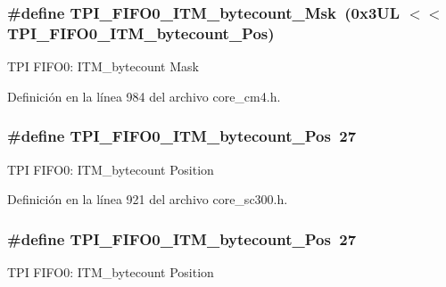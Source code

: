 \subsubsection[{\texorpdfstring{T\+P\+I\+\_\+\+F\+I\+F\+O0\+\_\+\+I\+T\+M\+\_\+bytecount\+\_\+\+Msk}{TPI_FIFO0_ITM_bytecount_Msk}}]{\setlength{\rightskip}{0pt plus 5cm}\#define T\+P\+I\+\_\+\+F\+I\+F\+O0\+\_\+\+I\+T\+M\+\_\+bytecount\+\_\+\+Msk~(0x3\+U\+L $<$$<$ T\+P\+I\+\_\+\+F\+I\+F\+O0\+\_\+\+I\+T\+M\+\_\+bytecount\+\_\+\+Pos)}\hypertarget{group___c_m_s_i_s___t_p_i_ga07bafa971b8daf0d63b3f92b9ae7fa16}{}\label{group___c_m_s_i_s___t_p_i_ga07bafa971b8daf0d63b3f92b9ae7fa16}
T\+PI F\+I\+F\+O0\+: I\+T\+M\+\_\+bytecount Mask 

Definición en la línea 984 del archivo core\+\_\+cm4.\+h.

\subsubsection[{\texorpdfstring{T\+P\+I\+\_\+\+F\+I\+F\+O0\+\_\+\+I\+T\+M\+\_\+bytecount\+\_\+\+Pos}{TPI_FIFO0_ITM_bytecount_Pos}}]{\setlength{\rightskip}{0pt plus 5cm}\#define T\+P\+I\+\_\+\+F\+I\+F\+O0\+\_\+\+I\+T\+M\+\_\+bytecount\+\_\+\+Pos~27}\hypertarget{group___c_m_s_i_s___t_p_i_gac2b6f7f13a2fa0be4aa7645a47dcac52}{}\label{group___c_m_s_i_s___t_p_i_gac2b6f7f13a2fa0be4aa7645a47dcac52}
T\+PI F\+I\+F\+O0\+: I\+T\+M\+\_\+bytecount Position 

Definición en la línea 921 del archivo core\+\_\+sc300.\+h.

\subsubsection[{\texorpdfstring{T\+P\+I\+\_\+\+F\+I\+F\+O0\+\_\+\+I\+T\+M\+\_\+bytecount\+\_\+\+Pos}{TPI_FIFO0_ITM_bytecount_Pos}}]{\setlength{\rightskip}{0pt plus 5cm}\#define T\+P\+I\+\_\+\+F\+I\+F\+O0\+\_\+\+I\+T\+M\+\_\+bytecount\+\_\+\+Pos~27}\hypertarget{group___c_m_s_i_s___t_p_i_gac2b6f7f13a2fa0be4aa7645a47dcac52}{}\label{group___c_m_s_i_s___t_p_i_gac2b6f7f13a2fa0be4aa7645a47dcac52}
T\+PI F\+I\+F\+O0\+: I\+T\+M\+\_\+bytecount Position 

